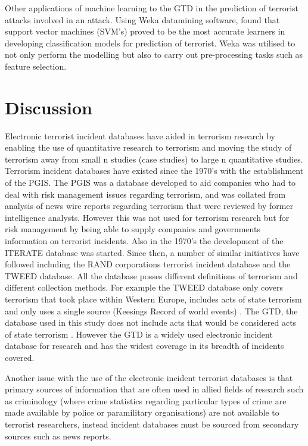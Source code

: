 Other applications of machine learning to the GTD in the prediction of terrorist attacks involved in an attack. Using Weka \citep{hall2009weka} datamining software, \citep{khorshid2015comparison} found that support vector machines (SVM's) proved to be the most accurate learners in developing classification models for prediction of terrorist. Weka was utilised to not only perform the modelling but also to carry out pre-processing tasks such as feature selection. 

\section{Discussion}
Electronic terrorist incident databases have aided in terrorism research by enabling the use of quantitative research to terrorism and moving the study of terrorism away from small n studies (case studies) to large n quantitative studies. Terrorism incident databases have existed since the 1970's with the establishment of the PGIS. The PGIS was a database developed to aid companies who had to deal with risk management issues regarding terrorism, and was collated from analysis of news wire reports regarding terrorism that were reviewed by former intelligence analysts. However this was not used for terrorism research but for risk management by being able to supply companies and governments information on terrorist incidents. Also in the 1970's the development of the ITERATE database was started. Since then, a number of similar initiatives have followed including the RAND corporations terrorist incident database and the TWEED database. All the database posses different definitions of terrorism and different collection methods. For example the TWEED database only covers terrorism that took place within Western Europe, includes acts of state terrorism and only uses a single source (Keesings Record of world events) \citep{ravndal2016right}. The GTD, the database used in this study does not include acts that would be considered acts of state terrorism \citep{lafree2016global}. However the GTD is a widely used electronic incident database for research and has the widest coverage in its breadth of incidents covered. 

Another issue with the use of the electronic incident terrorist databases is that primary sources of information that are often used in allied fields of research such as criminology (where crime statistics regarding particular types of crime are made available by police or paramilitary organisations) are not available to terrorist researchers, instead incident databases must be sourced from secondary sources such as news reports. 

